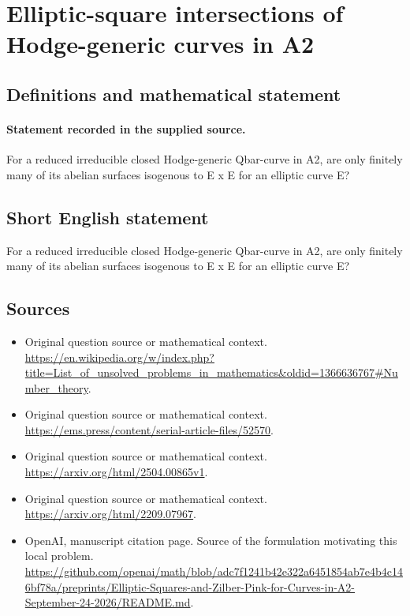 \documentclass[11pt]{article}
\begin{document}
\section*{Elliptic-square intersections of Hodge-generic curves in A2}\label{statement}
\subsection{Definitions and mathematical statement}
\paragraph{Statement recorded in the supplied source.}
For a reduced irreducible closed Hodge-generic Qbar-curve in A2, are only finitely many of its abelian surfaces isogenous to E x E for an elliptic curve E?
\subsection{Short English statement}
For a reduced irreducible closed Hodge-generic Qbar-curve in A2, are only finitely many of its abelian surfaces isogenous to E x E for an elliptic curve E?
\subsection{Sources}
\begin{itemize}
\item[S1] Original question source or mathematical context.
\url{https://en.wikipedia.org/w/index.php?title=List_of_unsolved_problems_in_mathematics&oldid=1366636767#Number_theory}.
\item[S2] Original question source or mathematical context.
\url{https://ems.press/content/serial-article-files/52570}.
\item[S3] Original question source or mathematical context.
\url{https://arxiv.org/html/2504.00865v1}.
\item[S4] Original question source or mathematical context.
\url{https://arxiv.org/html/2209.07967}.
\item[S5] OpenAI, manuscript citation page. Source of the formulation motivating this local problem.
\url{https://github.com/openai/math/blob/adc7f1241b42e322a6451854ab7e4b4c146bf78a/preprints/Elliptic-Squares-and-Zilber-Pink-for-Curves-in-A2-September-24-2026/README.md}.
\end{itemize}
\end{document}
